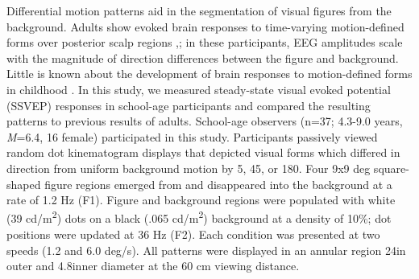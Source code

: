 \documentclass[landscape,final,paperwidth=72in,paperheight=40.5in,fontscale=0.285]{baposter}
\begin{document}
\begin{poster}
%
    {
      Differential motion patterns aid in the segmentation of visual figures from the background. 
Adults show evoked brain responses to time-varying motion-defined forms over posterior scalp regions \cite{fesi_cortical_2014},\cite{fesi_distinct_2011}; in these participants, EEG amplitudes scale with the magnitude of direction differences between the figure and background.
      Little is known about the development of brain responses to motion-defined forms in childhood \cite{gilmore_childrens_2016}. In this study, we measured steady-state visual evoked potential (SSVEP) responses in school-age participants and compared the resulting patterns to previous results of adults.    
    }
    {
      School-age observers (n=37; 4.3-9.0 years, \emph{M}=6.4, 16 female) participated in this study.  
      Participants passively viewed random dot kinematogram displays that depicted visual forms which differed in direction from uniform background motion by 5\degree, 45\degree, or 180\degree. Four 9x9 deg square-shaped figure regions emerged from and disappeared into the background at a rate of 1.2 Hz (F1). Figure and background regions were populated with white (39 cd/m\textsuperscript{2}) dots on a black (.065 cd/m\textsuperscript{2}) background at a density of 10\%; dot positions were updated at 36 Hz (F2). Each condition was presented at two speeds (1.2 and 6.0 deg/s). All patterns were displayed in an annular region 24\degree in outer and 4.8\degree inner diameter at the 60 cm viewing distance.  
}
\end{poster}
\end{document}
